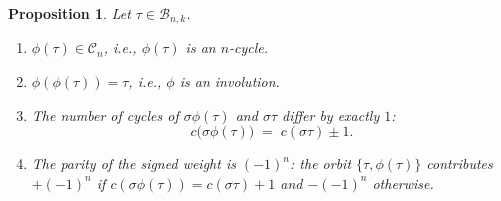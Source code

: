 \documentclass[12pt,a4paper]{article}
\newtheorem{proposition}[theorem]{Proposition}
\theoremstyle{definition}
\newcommand{\Cn}{\mathcal{C}_n}
\begin{document}
\begin{proposition}
\label{prop:involution}
Let $\tau\in\mathcal{B}_{n,k}$.
\begin{enumerate}[label=\textup{(\alph*)}]
\item $\phi(\tau)\in\Cn$, i.e., $\phi(\tau)$ is an $n$-cycle.
\item $\phi(\phi(\tau))=\tau$, i.e., $\phi$ is an involution.
\item The number of cycles of $\sigma\phi(\tau)$ and
  $\sigma\tau$ differ by exactly $1$:
  \[
    c\bigl(\sigma\phi(\tau)\bigr) \;=\; c(\sigma\tau) \pm 1.
  \]
\item The parity of the signed weight is $(-1)^n$:
  the orbit $\{\tau,\phi(\tau)\}$ contributes
  $+(-1)^n$ if $c(\sigma\phi(\tau))=c(\sigma\tau)+1$
  and $-(-1)^n$ otherwise.
\end{enumerate}
\end{proposition}
\end{document}
